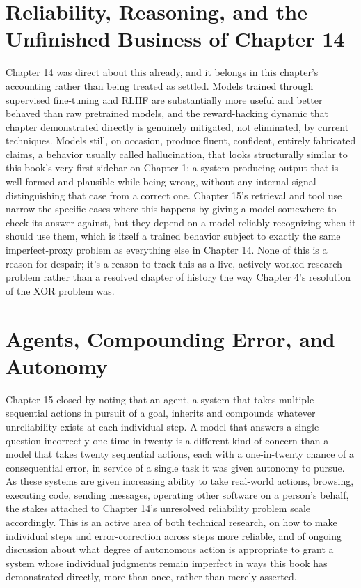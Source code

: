 \section*{Reliability, Reasoning, and the Unfinished Business of Chapter 14}

Chapter 14 was direct about this already, and it belongs in this chapter's accounting rather than being treated as settled. Models trained through supervised fine-tuning and RLHF are substantially more useful and better behaved than raw pretrained models, and the reward-hacking dynamic that chapter demonstrated directly is genuinely mitigated, not eliminated, by current techniques. Models still, on occasion, produce fluent, confident, entirely fabricated claims, a behavior usually called hallucination, that looks structurally similar to this book's very first sidebar on Chapter 1: a system producing output that is well-formed and plausible while being wrong, without any internal signal distinguishing that case from a correct one. Chapter 15's retrieval and tool use narrow the specific cases where this happens by giving a model somewhere to check its answer against, but they depend on a model reliably recognizing when it should use them, which is itself a trained behavior subject to exactly the same imperfect-proxy problem as everything else in Chapter 14. None of this is a reason for despair; it's a reason to track this as a live, actively worked research problem rather than a resolved chapter of history the way Chapter 4's resolution of the XOR problem was.

\section*{Agents, Compounding Error, and Autonomy}

Chapter 15 closed by noting that an agent, a system that takes multiple sequential actions in pursuit of a goal, inherits and compounds whatever unreliability exists at each individual step. A model that answers a single question incorrectly one time in twenty is a different kind of concern than a model that takes twenty sequential actions, each with a one-in-twenty chance of a consequential error, in service of a single task it was given autonomy to pursue. As these systems are given increasing ability to take real-world actions, browsing, executing code, sending messages, operating other software on a person's behalf, the stakes attached to Chapter 14's unresolved reliability problem scale accordingly. This is an active area of both technical research, on how to make individual steps and error-correction across steps more reliable, and of ongoing discussion about what degree of autonomous action is appropriate to grant a system whose individual judgments remain imperfect in ways this book has demonstrated directly, more than once, rather than merely asserted.

